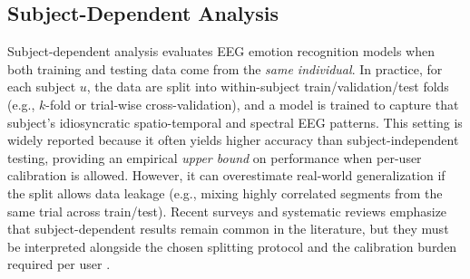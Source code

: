 \documentclass{WileyMSP-template}
\begin{document}
\subsection{Subject-Dependent Analysis}
\label{sec:subject_dependent_analysis}
Subject-dependent analysis evaluates EEG emotion recognition models when both training and testing data come from the \emph{same individual}. In practice, for each subject $u$, the data are split into within-subject train/validation/test folds (e.g., $k$-fold or trial-wise cross-validation), and a model is trained to capture that subject's idiosyncratic spatio-temporal and spectral EEG patterns. This setting is widely reported because it often yields higher accuracy than subject-independent testing, providing an empirical \emph{upper bound} on performance when per-user calibration is allowed. However, it can overestimate real-world generalization if the split allows data leakage (e.g., mixing highly correlated segments from the same trial across train/test). Recent surveys and systematic reviews emphasize that subject-dependent results remain common in the literature, but they must be interpreted alongside the chosen splitting protocol and the calibration burden required per user \cite{wang2024csur_researchprogress,apicella2024neucom_systematic,geng2025dlreview}.
\end{document}
